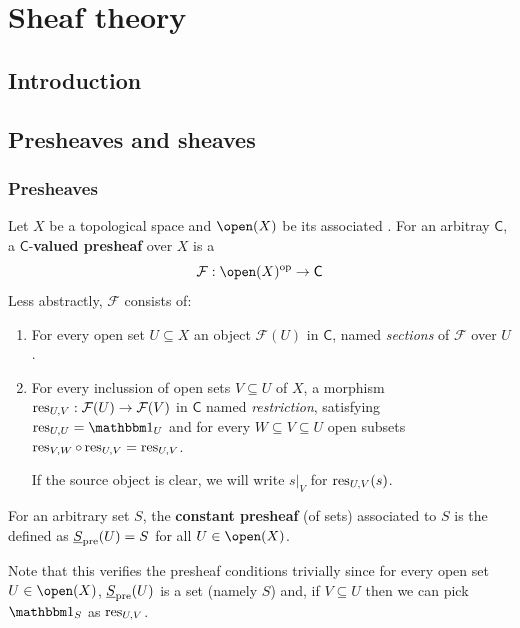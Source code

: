 \documentclass[../main.tex]{subfiles}
\begin{document}
\chapter{Sheaf theory}

\section{Introduction}


\section{Presheaves and sheaves}
\subsection{Presheaves}
\begin{definition}[Presheaf] \label{def:presheaf}
  Let \(X\) be a topological space and \(\open(X)\) be its associated .
  For an arbitray  \(\mathsf{C}\), a \(\mathsf{C}\)-\textbf{valued presheaf} over \(X\) is a 
  \begin{equation*}
    \mathcal{F}: \open(X)^{\op} \to \mathsf{C}
  \end{equation*}
  Less abstractly, \(\mathcal{F}\) consists of:
  \begin{enumerate}
    \item For every open set \(U \subseteq X\) an object \(\mathcal{F}(U)\) in \(\mathsf{C}\), named \textit{sections} of \(\mathcal{F}\) over \(U\).
    \item For every inclussion of open sets \(V \subseteq U\) of \(X\), a morphism \(\operatorname{res}_{U, V}: \mathcal{F}(U) \to \mathcal{F}(V)\) in \(\mathsf{C}\) named \textit{restriction}, satisfying \(\res_{U, U} = \id_{U}\) and for every \(W \subseteq V \subseteq U\) open subsets \(\operatorname{res}_{V, W} \circ \operatorname{res}_{U, V} = \operatorname{res}_{U, V}\).

    If the source object is clear, we will write \(s|_{V}\) for \(\operatorname{res}_{U, V}(s)\).
  \end{enumerate}
\end{definition}

\begin{example} \label{ex:constant-presheaf}
  For an arbitrary set \(S\), the \textbf{constant presheaf} (of sets) associated to \(S\) is the  defined as \(\underline{S}_{\operatorname*{pre}}(U) = S\) for all \(U \in \open(X)\).

  Note that this verifies the presheaf conditions trivially since for every open set \(U \in \open(X)\), \(\underline{S}_{\operatorname*{pre}}(U)\) is a set (namely \(S\)) and, if \(V \subseteq U\) then we can pick \(\id_{S}\) as \(\operatorname{res}_{U, V}\).
\end{example}
\end{document}
